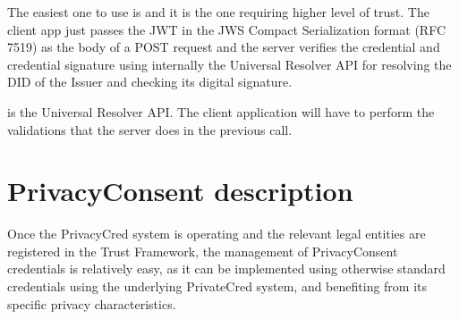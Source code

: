 \documentclass[letterpaper,10pt,english]{sphinxmanual}
\begin{document}
\sphinxAtStartPar
The easiest one to use is {\hyperref[\detokenize{privacycred:post--api-verifiable-credential-v1-verifiable-credential-validations}]{}} and it is the one requiring higher level of trust. The client app just passes the JWT in the JWS Compact Serialization format (RFC 7519) as the body of a POST request and the server verifies the credential and credential signature using internally the Universal Resolver API for resolving the DID of the Issuer and checking its digital signature.

\sphinxAtStartPar
{\hyperref[\detokenize{privacycred:get--api-did-v1-identifiers-(string-DID)}]{}} is the Universal Resolver API. The client application will have to perform the validations that the server does in the previous call.


\chapter{PrivacyConsent description}
\label{\detokenize{privacycred:privacyconsent-description}}
\sphinxAtStartPar
Once the PrivacyCred system is operating and the relevant legal entities are registered in the Trust Framework, the management of PrivacyConsent credentials is relatively easy, as it can be implemented using otherwise standard credentials using the underlying PrivateCred system, and benefiting from its specific privacy characteristics.
\end{document}
